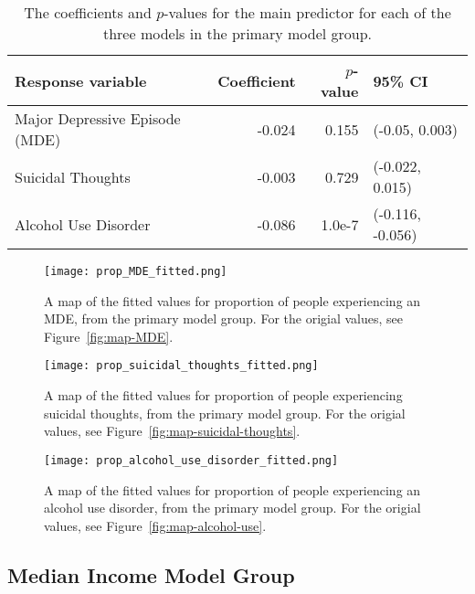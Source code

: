 \documentclass{article}
\begin{document}
\begin{table}[!htb]
\begin{center}
    \begin{tabular}{l|r|r|l}
        \hline
        Response variable & Coefficient & $p$-value & 95\% CI\\
        \hline
        Major Depressive Episode (MDE) & -0.024 & 0.155 & (-0.05, 0.003)\\
        Suicidal Thoughts & -0.003 & 0.729 & (-0.022, 0.015)\\
        Alcohol Use Disorder & -0.086 & 1.0e-7 & (-0.116, -0.056)\\
        \hline
    \end{tabular}
\caption{\label{tab:primary-model-results} The coefficients and $p$-values
    for the main predictor for each of the three models
    in the primary model group.
}
\end{center}
\end{table}

\begin{figure}[!htb]
    \centering
    \texttt{[image: prop\_MDE\_fitted.png]}
    \caption{A map of the fitted values for proportion of people experiencing an
    MDE, from the primary model group. For the origial values, see
    Figure~\ref{fig:map-MDE}.}
    \label{fig:map-fitted-MDE}
\end{figure}

\begin{figure}[!htb]
    \centering
    \texttt{[image: prop\_suicidal\_thoughts\_fitted.png]}
    \caption{A map of the fitted values for proportion of people experiencing
    suicidal thoughts, from the primary model group. For the origial values, see
    Figure~\ref{fig:map-suicidal-thoughts}.}
    \label{fig:map-fitted-suicidal-thoughts}
\end{figure}

\begin{figure}[!htb]
    \centering
    \texttt{[image: prop\_alcohol\_use\_disorder\_fitted.png]}
    \caption{A map of the fitted values for proportion of people experiencing an
    alcohol use disorder, from the primary model group.
    For the origial values, see Figure~\ref{fig:map-alcohol-use}.}
    \label{fig:map-fitted-alcohol-use}
\end{figure}

\subsection{Median Income Model Group}
\end{document}
